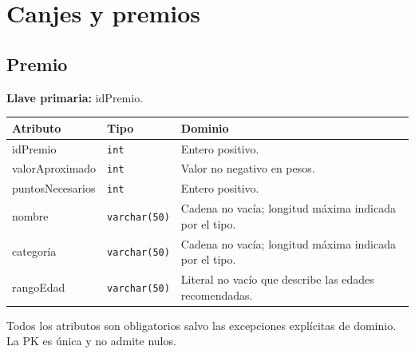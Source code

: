 \section{Canjes y premios}
\par\noindent\begin{minipage}{\textwidth}
\subsection{Premio}
\par
\textbf{Llave primaria:} idPremio.\par
{\small\begin{tabular}{@{}p{}p{}p{}@{}}
\toprule Atributo & Tipo & Dominio \\ \midrule
idPremio & \texttt{int} & Entero positivo. \\
valorAproximado & \texttt{int} & Valor no negativo en pesos. \\
puntosNecesarios & \texttt{int} & Entero positivo. \\
nombre & \texttt{varchar(50)} & Cadena no vacía; longitud máxima indicada por el tipo. \\
categoría & \texttt{varchar(50)} & Cadena no vacía; longitud máxima indicada por el tipo. \\
rangoEdad & \texttt{varchar(50)} & Literal no vacío que describe las edades recomendadas. \\
\bottomrule\end{tabular}}
Todos los atributos son obligatorios salvo las excepciones explícitas de dominio. La PK es única y no admite nulos.
\end{minipage}\par\vspace{.35cm}
